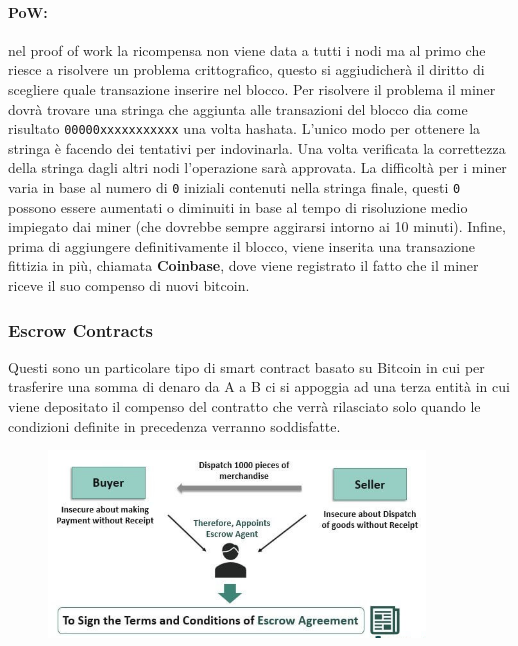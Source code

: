 \paragraph{PoW:}
nel proof of work la ricompensa non viene data a tutti i nodi ma al primo che
riesce a risolvere un problema crittografico, questo si aggiudicherà il diritto
di scegliere quale transazione inserire nel blocco. Per risolvere il problema il
miner dovrà trovare una stringa che aggiunta alle transazioni del blocco dia
come risultato \verb|00000xxxxxxxxxxx| una volta hashata. L'unico modo per
ottenere la stringa è facendo dei tentativi per indovinarla. Una volta
verificata la correttezza della stringa dagli altri nodi l'operazione sarà
approvata. La difficoltà per i miner varia in base al numero di \verb|0|
iniziali contenuti nella stringa finale, questi \verb|0| possono essere
aumentati o diminuiti in base al tempo di risoluzione medio impiegato dai miner
(che dovrebbe sempre aggirarsi intorno ai 10 minuti). Infine, prima di
aggiungere definitivamente il blocco, viene inserita una transazione fittizia in
più, chiamata \textbf{Coinbase}, dove viene registrato il fatto che il miner riceve
il suo compenso di nuovi bitcoin.

\subsubsection{Escrow Contracts}

Questi sono un particolare tipo di smart contract basato su Bitcoin in cui per
trasferire una somma di denaro da A a B ci si appoggia ad una terza entità in
cui viene depositato il compenso del contratto che verrà rilasciato solo quando
le condizioni definite in precedenza verranno soddisfatte.

\begin{figure}[H]
    \centering
    \includegraphics[width=10cm, keepaspectratio]{capitoli/bitcoin/imgs/escort.png}
\end{figure}